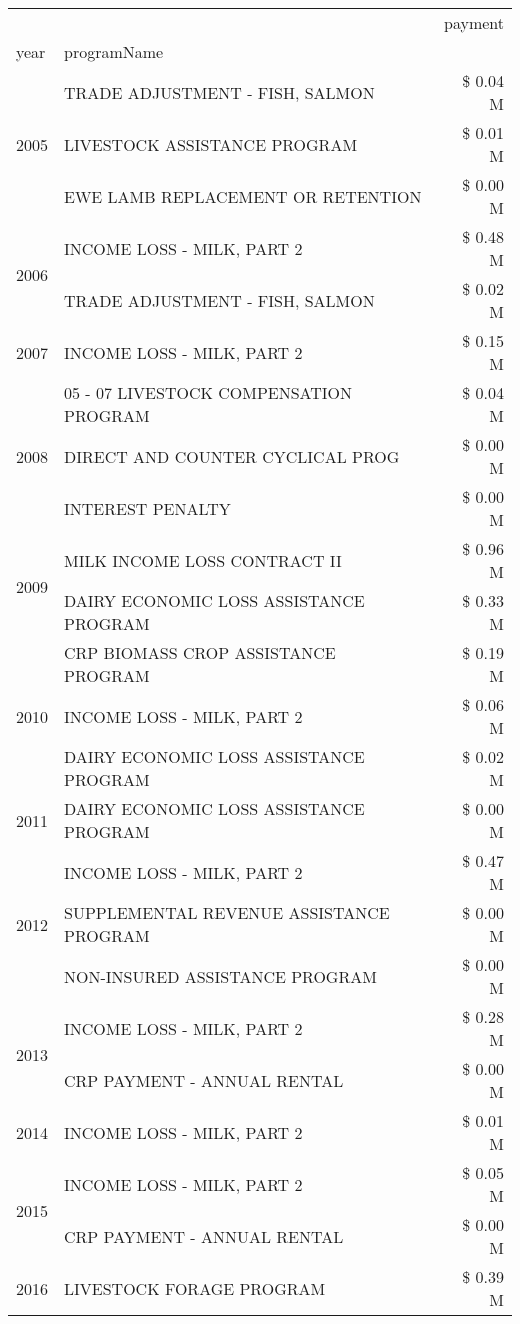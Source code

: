 \begin{tabular}{llr}
\toprule
 &  & payment \\
year & programName &  \\
\midrule
\multirow[t]{3}{*}{2005} & TRADE ADJUSTMENT - FISH, SALMON & \$ 0.04 M \\
 & LIVESTOCK ASSISTANCE PROGRAM & \$ 0.01 M \\
 & EWE LAMB REPLACEMENT OR RETENTION & \$ 0.00 M \\
\cline{1-3}
\multirow[t]{2}{*}{2006} & INCOME LOSS - MILK, PART 2 & \$ 0.48 M \\
 & TRADE ADJUSTMENT - FISH, SALMON & \$ 0.02 M \\
\cline{1-3}
2007 & INCOME LOSS - MILK, PART 2 & \$ 0.15 M \\
\cline{1-3}
\multirow[t]{3}{*}{2008} & 05 - 07 LIVESTOCK COMPENSATION PROGRAM & \$ 0.04 M \\
 & DIRECT AND COUNTER CYCLICAL PROG & \$ 0.00 M \\
 & INTEREST PENALTY & \$ 0.00 M \\
\cline{1-3}
\multirow[t]{2}{*}{2009} & MILK INCOME LOSS CONTRACT II & \$ 0.96 M \\
 & DAIRY ECONOMIC LOSS ASSISTANCE PROGRAM & \$ 0.33 M \\
\cline{1-3}
\multirow[t]{3}{*}{2010} & CRP BIOMASS CROP ASSISTANCE PROGRAM & \$ 0.19 M \\
 & INCOME LOSS - MILK, PART 2 & \$ 0.06 M \\
 & DAIRY ECONOMIC LOSS ASSISTANCE PROGRAM & \$ 0.02 M \\
\cline{1-3}
2011 & DAIRY ECONOMIC LOSS ASSISTANCE PROGRAM & \$ 0.00 M \\
\cline{1-3}
\multirow[t]{3}{*}{2012} & INCOME LOSS - MILK, PART 2 & \$ 0.47 M \\
 & SUPPLEMENTAL REVENUE ASSISTANCE PROGRAM & \$ 0.00 M \\
 & NON-INSURED ASSISTANCE PROGRAM & \$ 0.00 M \\
\cline{1-3}
\multirow[t]{2}{*}{2013} & INCOME LOSS - MILK, PART 2 & \$ 0.28 M \\
 & CRP PAYMENT - ANNUAL RENTAL & \$ 0.00 M \\
\cline{1-3}
2014 & INCOME LOSS - MILK, PART 2 & \$ 0.01 M \\
\cline{1-3}
\multirow[t]{2}{*}{2015} & INCOME LOSS - MILK, PART 2 & \$ 0.05 M \\
 & CRP PAYMENT - ANNUAL RENTAL & \$ 0.00 M \\
\cline{1-3}
\multirow[t]{3}{*}{2016} & LIVESTOCK FORAGE PROGRAM & \$ 0.39 M \\

\end{tabular}
